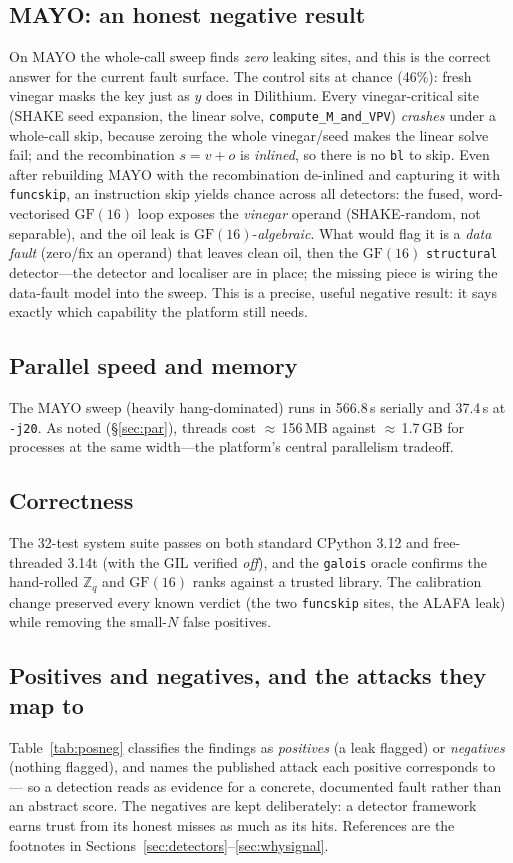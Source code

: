 \documentclass[11pt]{article}
\newcommand{\code}[1]{\texttt{#1}}
\newcommand{\Zq}{\ensuremath{\mathbb{Z}_q}}
\newcommand{\GF}[1]{\ensuremath{\mathrm{GF}(#1)}}
\begin{document}
\subsection{MAYO: an honest negative result}
On MAYO the whole-call sweep finds \emph{zero} leaking sites, and this is the correct
answer for the current fault surface. The control sits at chance (46\%): fresh
vinegar masks the key just as $y$ does in Dilithium. Every vinegar-critical site
(SHAKE seed expansion, the linear solve, \code{compute\_M\_and\_VPV}) \emph{crashes}
under a whole-call skip, because zeroing the whole vinegar/seed makes the linear
solve fail; and the recombination $s=v+o$ is \emph{inlined}, so there is no
\code{bl} to skip. Even after rebuilding MAYO with the recombination de-inlined and
capturing it with \code{funcskip}, an instruction skip yields chance across all
detectors: the fused, word-vectorised \GF{16} loop exposes the \emph{vinegar}
operand (SHAKE-random, not separable), and the oil leak is \GF{16}-\emph{algebraic}.
What would flag it is a \emph{data fault} (zero/fix an operand) that leaves clean
oil, then the \GF{16} \code{structural} detector---the detector and localiser are in
place; the missing piece is wiring the data-fault model into the sweep. This is a
precise, useful negative result: it says exactly which capability the platform still
needs.

\subsection{Parallel speed and memory}
The MAYO sweep (heavily hang-dominated) runs in 566.8\,s serially and 37.4\,s at
\code{-j20}. As noted (\S\ref{sec:par}), threads cost $\approx$\,156\,MB against
$\approx$\,1.7\,GB for processes at the same width---the platform's central
parallelism tradeoff.

\subsection{Correctness}
The 32-test system suite passes on both standard CPython 3.12 and free-threaded
3.14t (with the GIL verified \emph{off}), and the \code{galois} oracle confirms the
hand-rolled \Zq{} and \GF{16} ranks against a trusted library. The calibration
change preserved every known verdict (the two \code{funcskip} sites, the ALAFA leak)
while removing the small-$N$ false positives.

\subsection{Positives and negatives, and the attacks they map to}\label{sec:posneg}
Table~\ref{tab:posneg} classifies the findings as \emph{positives} (a leak flagged)
or \emph{negatives} (nothing flagged), and names the published attack each positive
corresponds to --- so a detection reads as evidence for a concrete, documented fault
rather than an abstract score. The negatives are kept deliberately: a detector
framework earns trust from its honest misses as much as its hits. References are the
footnotes in Sections~\ref{sec:detectors}--\ref{sec:whysignal}.
\end{document}
